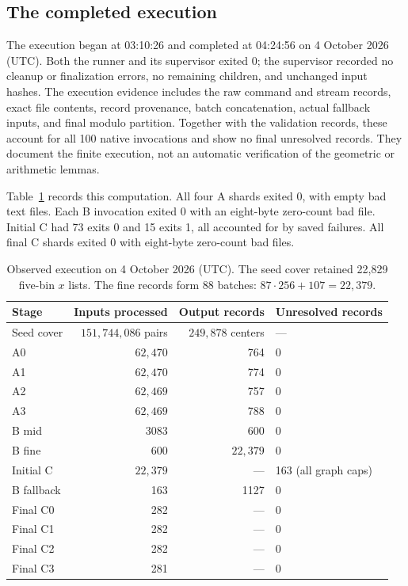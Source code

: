 \subsection{The completed execution}
\label{execute:observed}

The execution began at 03:10:26 and completed at 04:24:56 on
4 October 2026 (UTC). Both the runner and its supervisor exited 0;
the supervisor recorded no cleanup or finalization errors, no remaining
children, and unchanged input hashes. The execution evidence includes
the raw command and stream records, exact file contents, record provenance,
batch concatenation, actual fallback inputs, and final modulo partition.
Together with the validation records, these account for all 100 native
invocations and show no final unresolved records. They document the finite
execution, not an automatic verification of the geometric or arithmetic
lemmas.

Table~\ref{execute:counts} records this computation. All four A shards exited 0,
with empty bad text files. Each B invocation exited 0 with an eight-byte
zero-count bad file. Initial C had 73 exits 0 and 15 exits 1, all
accounted for by saved failures. All final C shards exited 0 with
eight-byte zero-count bad files.

\begin{table}[htbp]
\centering
\small
\begin{tabular}{lrrl}
\toprule
Stage & Inputs processed & Output records & Unresolved records\\
\midrule
Seed cover & $151{,}744{,}086$ pairs & $249{,}878$ centers & ---\\
A0 & $62{,}470$ & 764 & 0\\
A1 & $62{,}470$ & 774 & 0\\
A2 & $62{,}469$ & 757 & 0\\
A3 & $62{,}469$ & 788 & 0\\
B mid & 3083 & 600 & 0\\
B fine & 600 & $22{,}379$ & 0\\
Initial C & $22{,}379$ & --- & 163 (all graph caps)\\
B fallback & 163 & 1127 & 0\\
Final C0 & 282 & --- & 0\\
Final C1 & 282 & --- & 0\\
Final C2 & 282 & --- & 0\\
Final C3 & 281 & --- & 0\\
\bottomrule
\end{tabular}
\caption{Observed execution on 4 October 2026 (UTC). The seed cover retained
22,829 five-bin $x$ lists. The fine records form 88 batches:
$87\cdot256+107=22{,}379$.}
\label{execute:counts}
\end{table}

